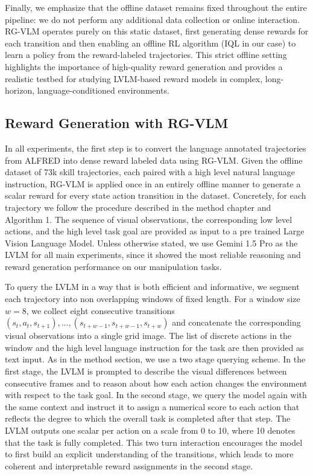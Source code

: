 \documentclass[master,english,final]{kaist-ucs}
\begin{document}
Finally, we emphasize that the offline dataset remains fixed throughout the entire pipeline: we do not perform any additional data collection or online interaction. RG-VLM operates purely on this static dataset, first generating dense rewards for each transition and then enabling an offline RL algorithm (IQL in our case) to learn a policy from the reward-labeled trajectories. This strict offline setting highlights the importance of high-quality reward generation and provides a realistic testbed for studying LVLM-based reward models in complex, long-horizon, language-conditioned environments.

\subsection{Reward Generation with RG-VLM}
In all experiments, the first step is to convert the language annotated trajectories from ALFRED into dense reward labeled data using RG-VLM. Given the offline dataset of 73k skill trajectories, each paired with a high level natural language instruction, RG-VLM is applied once in an entirely offline manner to generate a scalar reward for every state action transition in the dataset. Concretely, for each trajectory we follow the procedure described in the method chapter and Algorithm 1. The sequence of visual observations, the corresponding low level actions, and the high level task goal are provided as input to a pre trained Large Vision Language Model. Unless otherwise stated, we use Gemini 1.5 Pro as the LVLM for all main experiments, since it showed the most reliable reasoning and reward generation performance on our manipulation tasks. 

To query the LVLM in a way that is both efficient and informative, we segment each trajectory into non overlapping windows of fixed length. For a window size $w=8$, we collect eight consecutive transitions $(s_t, a_t, s_{t+1}), ..., (s_{t+w-1}, s_{t+w-1}, s_{t+w})$ and concatenate the corresponding visual observations into a single grid image. The list of discrete actions in the window and the high level language instruction for the task are then provided as text input. As in the method section, we use a two stage querying scheme. In the first stage, the LVLM is prompted to describe the visual differences between consecutive frames and to reason about how each action changes the environment with respect to the task goal. In the second stage, we query the model again with the same context and instruct it to assign a numerical score to each action that reflects the degree to which the overall task is completed after that step. The LVLM outputs one scalar per action on a scale from 0 to 10, where 10 denotes that the task is fully completed. This two turn interaction encourages the model to first build an explicit understanding of the transitions, which leads to more coherent and interpretable reward assignments in the second stage.
\end{document}
